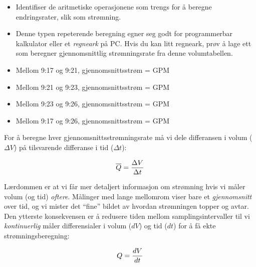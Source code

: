 \begin{itemize}
\item{} Identifiser de aritmetiske operasjonene som trengs for å beregne endringsrater, slik som strømning.
\item{} Denne typen repeterende beregning egner seg godt for programmerbar kalkulator eller et {\it regneark} på PC. Hvis du kan litt regneark, prøv å lage ett som beregner gjennomsnittlig strømningsrate fra denne volumtabellen.
\end{itemize}







\begin{itemize}
\item{} Mellom 9:17 og 9:21, gjennomsnittsstrøm =  GPM
\vskip 5pt
\item{} Mellom 9:21 og 9:23, gjennomsnittsstrøm =  GPM
\vskip 5pt
\item{} Mellom 9:23 og 9:26, gjennomsnittsstrøm =  GPM
\vskip 10pt
\item{} Mellom 9:17 og 9:26, gjennomsnittsstrøm =  GPM
\end{itemize}







For å beregne hver gjennomsnittsstrømningsrate må vi dele differansen i volum ($\Delta V$) på tilsvarende differanse i tid ($\Delta t$):

$$\overline{Q} = {\Delta V \over \Delta t}$$

\vskip 10pt

Lærdommen er at vi får mer detaljert informasjon om strømning hvis vi måler volum (og tid) {\it oftere}. Målinger med lange mellomrom viser bare et {\it gjennomsnitt} over tid, og vi mister det ``fine'' bildet av hvordan strømningen topper og avtar. Den ytterste konsekvensen er å redusere tiden mellom samplingsintervaller til vi {\it kontinuerlig} måler differensialer i volum ($dV$) og tid ($dt$) for å få ekte strømningsberegning:

$$Q = {dV \over dt}$$




